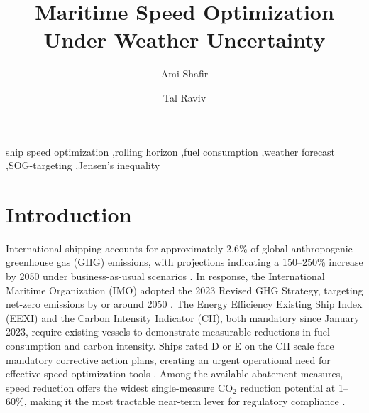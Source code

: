 \documentclass[review]{elsarticle}
\begin{document}
\begin{frontmatter}

\title{Maritime Speed Optimization Under Weather Uncertainty}

\author[tau]{Ami Shafir}
\author[tau]{Tal Raviv}
\address[tau]{Faculty of Engineering, Tel Aviv University, Tel Aviv, Israel}

\begin{abstract}
\end{abstract}

\begin{keyword}
ship speed optimization \sep rolling horizon \sep fuel consumption \sep weather forecast \sep SOG-targeting \sep Jensen's inequality
\end{keyword}

\end{frontmatter}

\section{Introduction}
\label{sec:introduction}

International shipping accounts for approximately 2.6\% of global anthropogenic greenhouse gas (GHG) emissions, with projections indicating a 150--250\% increase by 2050 under business-as-usual scenarios \cite{Bouman2017}. In response, the International Maritime Organization (IMO) adopted the 2023 Revised GHG Strategy, targeting net-zero emissions by or around 2050 \cite{Tadros2023}. The Energy Efficiency Existing Ship Index (EEXI) and the Carbon Intensity Indicator (CII), both mandatory since January 2023, require existing vessels to demonstrate measurable reductions in fuel consumption and carbon intensity. Ships rated D or E on the CII scale face mandatory corrective action plans, creating an urgent operational need for effective speed optimization tools \cite{Tadros2023}. Among the available abatement measures, speed reduction offers the widest single-measure CO$_2$ reduction potential at 1--60\%, making it the most tractable near-term lever for regulatory compliance \cite{Bouman2017}.
\end{document}
